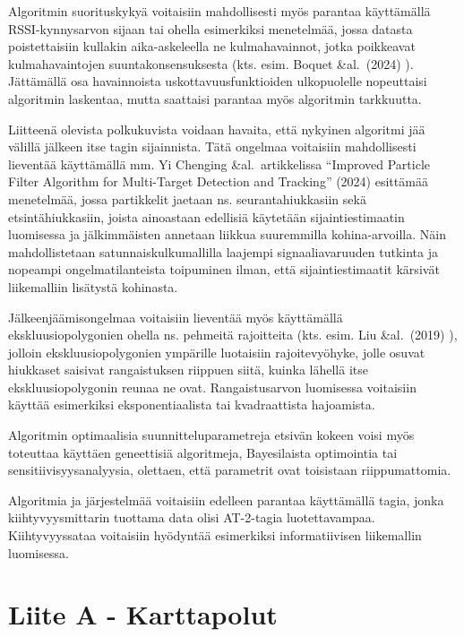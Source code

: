 \documentclass[
  12pt,
  a4paper, twoside]{book}
\begin{document}
Algoritmin suorituskykyä voitaisiin mahdollisesti myös parantaa käyttämällä RSSI-kynnysarvon sijaan tai ohella esimerkiksi menetelmää, jossa datasta poistettaisiin kullakin aika-askeleella ne kulmahavainnot, jotka poikkeavat kulmahavaintojen suuntakonsensuksesta (kts. esim. Boquet \&al.~(2024) \citep{Boquet-2024}). Jättämällä osa havainnoista uskottavuusfunktioiden ulkopuolelle nopeuttaisi algoritmin laskentaa, mutta saattaisi parantaa myös algoritmin tarkkuutta.

Liitteenä olevista polkukuvista voidaan havaita, että nykyinen algoritmi jää välillä jälkeen itse tagin sijainnista. Tätä ongelmaa voitaisiin mahdollisesti lieventää käyttämällä mm. Yi Chenging \&al.~artikkelissa ``Improved Particle Filter Algorithm for Multi-Target Detection and Tracking'' (2024) \citep{Cheng-2024} esittämää menetelmää, jossa partikkelit jaetaan ns. seurantahiukkasiin sekä etsintähiukkasiin, joista ainoastaan edellisiä käytetään sijaintiestimaatin luomisessa ja jälkimmäisten annetaan liikkua suuremmilla kohina-arvoilla. Näin mahdollistetaan satunnaiskulkumallilla laajempi signaaliavaruuden tutkinta ja nopeampi ongelmatilanteista toipuminen ilman, että sijaintiestimaatit kärsivät liikemalliin lisätystä kohinasta.

Jälkeenjäämisongelmaa voitaisiin lieventää myös käyttämällä ekskluusiopolygonien ohella ns. pehmeitä rajoitteita (kts. esim. Liu \&al.~(2019) \citep{Liu-2019}), jolloin ekskluusiopolygonien ympärille luotaisiin rajoitevyöhyke, jolle osuvat hiukkaset saisivat rangaistuksen riippuen siitä, kuinka lähellä itse ekskluusiopolygonin reunaa ne ovat. Rangaistusarvon luomisessa voitaisiin käyttää esimerkiksi eksponentiaalista tai kvadraattista hajoamista.

Algoritmin optimaalisia suunnitteluparametreja etsivän kokeen voisi myös toteuttaa käyttäen geneettisiä algoritmeja, Bayesilaista optimointia tai sensitiivisyysanalyysia, olettaen, että parametrit ovat toisistaan riippumattomia.

Algoritmia ja järjestelmää voitaisiin edelleen parantaa käyttämällä tagia, jonka kiihtyvyysmittarin tuottama data olisi AT-2-tagia luotettavampaa. Kiihtyvyyssataa voitaisiin hyödyntää esimerkiksi informatiivisen liikemallin luomisessa.

\chapter*{Liite A - Karttapolut}\label{liite-a---karttapolut}
\end{document}
